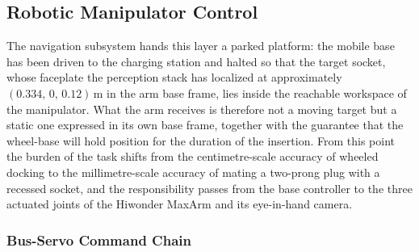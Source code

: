 \subsection{Robotic Manipulator Control}\label{meth:sec:manip}

The navigation subsystem hands this layer a parked platform: the mobile base has been driven to the charging station and halted so that the target socket, whose faceplate the perception stack has localized at approximately $(0.334,\,0,\,0.12)\,\ensuremath{\mathrm{m}}$ in the arm base frame, lies inside the reachable workspace of the manipulator. What the arm receives is therefore not a moving target but a static one expressed in its own base frame, together with the guarantee that the wheel-base will hold position for the duration of the insertion. From this point the burden of the task shifts from the centimetre-scale accuracy of wheeled docking to the millimetre-scale accuracy of mating a two-prong plug with a recessed socket, and the responsibility passes from the base controller to the three actuated joints of the Hiwonder MaxArm and its eye-in-hand camera.

\subsubsection{Bus-Servo Command Chain}\label{meth:sec:manip:bus}

